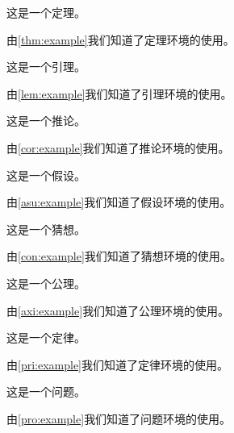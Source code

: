\documentclass[withoutpreface,bwprint]{cumcmthesis} %
\begin{document}
\begin{appendices}
\begin{theorem}
	这是一个定理。
	\label{thm:example}
\end{theorem}
由\cref{thm:example}我们知道了定理环境的使用。





\begin{lemma}
	这是一个引理。
	\label{lem:example}
\end{lemma}
由\cref{lem:example}我们知道了引理环境的使用。







\begin{corollary}
	这是一个推论。
	\label{cor:example}
\end{corollary}
由\cref{cor:example}我们知道了推论环境的使用。








\begin{assumption}
	这是一个假设。
	\label{asu:example}
\end{assumption}
由\cref{asu:example}我们知道了假设环境的使用。





\begin{conjecture}
	这是一个猜想。
	\label{con:example}
\end{conjecture}
由\cref{con:example}我们知道了猜想环境的使用。




\begin{axiom}
	这是一个公理。
	\label{axi:example}
\end{axiom}
由\cref{axi:example}我们知道了公理环境的使用。





\begin{principle}
	这是一个定律。
	\label{pri:example}
\end{principle}
由\cref{pri:example}我们知道了定律环境的使用。





\begin{problem}
	这是一个问题。
	\label{pro:example}
\end{problem}
由\cref{pro:example}我们知道了问题环境的使用。






\end{appendices}
\end{document}
